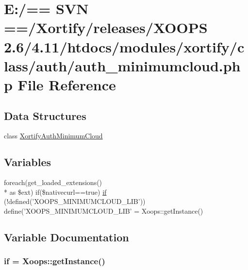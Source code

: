 \hypertarget{auth__minimumcloud_8php}{\section{E\-:/== S\-V\-N ==/\-Xortify/releases/\-X\-O\-O\-P\-S 2.6/4.11/htdocs/modules/xortify/class/auth/auth\-\_\-minimumcloud.php File Reference}
\label{auth__minimumcloud_8php}
}
\subsection*{Data Structures}
\begin{DoxyCompactItemize}
\item 
class \hyperlink{class_xortify_auth_minimum_cloud}{Xortify\-Auth\-Minimum\-Cloud}
\end{DoxyCompactItemize}
\subsection*{Variables}
\begin{DoxyCompactItemize}
\item 
foreach(get\-\_\-loaded\-\_\-extensions() \\*
as \$ext) if(\$nativecurl==true) \hyperlink{auth__minimumcloud_8php_ad3f5451abb22c5d78bd5abeac2cf7cfd}{if} (!defined('X\-O\-O\-P\-S\-\_\-\-M\-I\-N\-I\-M\-U\-M\-C\-L\-O\-U\-D\-\_\-\-L\-I\-B')) define('X\-O\-O\-P\-S\-\_\-\-M\-I\-N\-I\-M\-U\-M\-C\-L\-O\-U\-D\-\_\-\-L\-I\-B' = Xoops\-::get\-Instance()
\end{DoxyCompactItemize}


\subsection{Variable Documentation}
\hypertarget{auth__minimumcloud_8php_ad3f5451abb22c5d78bd5abeac2cf7cfd}{
\subsubsection[{if}]{\setlength{\rightskip}{0pt plus 5cm}if = Xoops\-::get\-Instance()}}\label{auth__minimumcloud_8php_ad3f5451abb22c5d78bd5abeac2cf7cfd}
